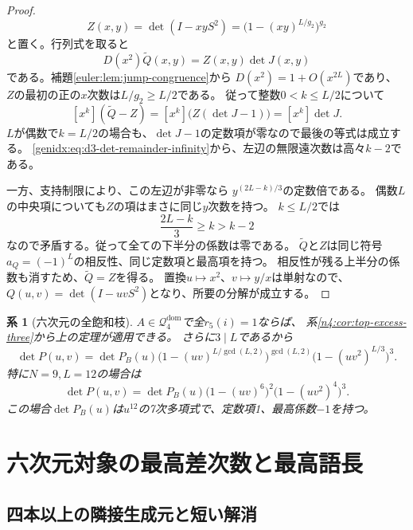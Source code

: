 \documentclass[11pt,a4paper]{ltjsarticle}
\newtheorem{corollary}[theorem]{系}
\theoremstyle{definition}
\begin{document}
\begin{proof}
\[
 Z(x,y)=\det(I-xyS^2)
       =\bigl(1-(xy)^{L/g_2}\bigr)^{g_2}
\]
と置く。行列式を取ると
\[
 D(x^2)\widetilde Q(x,y)=Z(x,y)\det J(x,y)
\]
である。補題\ref{euler:lem:jump-congruence}から
$D(x^2)=1+O(x^{2L})$であり、
$Z$の最初の正の$x$次数は$L/g_2\ge L/2$である。
従って整数$0<k\le L/2$について
\[
 [x^k](\widetilde Q-Z)
 =[x^k]\bigl(Z(\det J-1)\bigr)
 =[x^k]\det J.
\]
$L$が偶数で$k=L/2$の場合も、$\det J-1$の定数項が零なので最後の等式は成立する。
\eqref{genidx:eq:d3-det-remainder-infinity}から、左辺の無限遠次数は高々$k-2$である。

一方、支持制限により、この左辺が非零なら
$y^{(2L-k)/3}$の定数倍である。
偶数$L$の中央項についても$Z$の項はまさに同じ$y$次数を持つ。
$k\le L/2$では
\[
 \frac{2L-k}{3}\ge k>k-2
\]
なので矛盾する。従って全ての下半分の係数は零である。
$\widetilde Q$と$Z$は同じ符号$a_Q=(-1)^L$の相反性、同じ定数項と最高項を持つ。
相反性が残る上半分の係数も消すため、$\widetilde Q=Z$を得る。
置換$u\mapsto x^2$、$v\mapsto y/x$は単射なので、
$Q(u,v)=\det(I-uvS^2)$となり、所要の分解が成立する。
\end{proof}

\begin{corollary}[六次元の全飽和枝]
\label{n4:cor:full-r5-euler-factorization}
$A\in\mathcal Q_4^{\mathrm{dom}}$で全$r_5(i)=1$ならば、
系\ref{n4:cor:top-excess-three}から上の定理が適用できる。
さらに$3\mid L$であるから
\[
 \det P(u,v)=\det P_B(u)
   \bigl(1-(uv)^{L/\gcd(L,2)}\bigr)^{\gcd(L,2)}
   \bigl(1-(uv^2)^{L/3}\bigr)^3.
\]
特に$N=9,L=12$の場合は
\[
 \det P(u,v)=\det P_B(u)
             \bigl(1-(uv)^6\bigr)^2
             \bigl(1-(uv^2)^4\bigr)^3.
\]
この場合$\det P_B(u)$は$u^{12}$の7次多項式で、定数項1、最高係数$-1$を持つ。
\end{corollary}

\clearpage
\section{六次元対象の最高差次数と最高語長}\label{n4:sec:top-degrees}
\subsection{四本以上の隣接生成元と短い解消}
\end{document}
